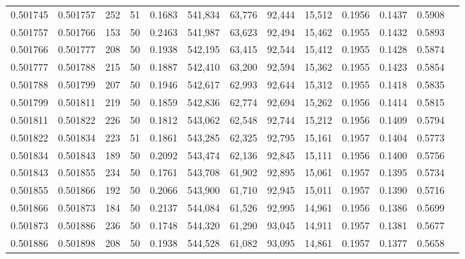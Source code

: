 \begin{tabular}{rrrrrrrrrrrrr}
0.501745 & 0.501757 & 252 &  51 &                                     0.1683 & 541,834 &  63,776 &  92,444 &  15,512 & 0.1956 & 0.1437 & 0.5908 \\
0.501757 & 0.501766 & 153 &  50 &                                     0.2463 & 541,987 &  63,623 &  92,494 &  15,462 & 0.1955 & 0.1432 & 0.5893 \\
0.501766 & 0.501777 & 208 &  50 &                                     0.1938 & 542,195 &  63,415 &  92,544 &  15,412 & 0.1955 & 0.1428 & 0.5874 \\
0.501777 & 0.501788 & 215 &  50 &                                     0.1887 & 542,410 &  63,200 &  92,594 &  15,362 & 0.1955 & 0.1423 & 0.5854 \\
0.501788 & 0.501799 & 207 &  50 &                                     0.1946 & 542,617 &  62,993 &  92,644 &  15,312 & 0.1955 & 0.1418 & 0.5835 \\
0.501799 & 0.501811 & 219 &  50 &                                     0.1859 & 542,836 &  62,774 &  92,694 &  15,262 & 0.1956 & 0.1414 & 0.5815 \\
0.501811 & 0.501822 & 226 &  50 &                                     0.1812 & 543,062 &  62,548 &  92,744 &  15,212 & 0.1956 & 0.1409 & 0.5794 \\
0.501822 & 0.501834 & 223 &  51 &                                     0.1861 & 543,285 &  62,325 &  92,795 &  15,161 & 0.1957 & 0.1404 & 0.5773 \\
0.501834 & 0.501843 & 189 &  50 &                                     0.2092 & 543,474 &  62,136 &  92,845 &  15,111 & 0.1956 & 0.1400 & 0.5756 \\
0.501843 & 0.501855 & 234 &  50 &                                     0.1761 & 543,708 &  61,902 &  92,895 &  15,061 & 0.1957 & 0.1395 & 0.5734 \\
0.501855 & 0.501866 & 192 &  50 &                                     0.2066 & 543,900 &  61,710 &  92,945 &  15,011 & 0.1957 & 0.1390 & 0.5716 \\
0.501866 & 0.501873 & 184 &  50 &                                     0.2137 & 544,084 &  61,526 &  92,995 &  14,961 & 0.1956 & 0.1386 & 0.5699 \\
0.501873 & 0.501886 & 236 &  50 &                                     0.1748 & 544,320 &  61,290 &  93,045 &  14,911 & 0.1957 & 0.1381 & 0.5677 \\
0.501886 & 0.501898 & 208 &  50 &                                     0.1938 & 544,528 &  61,082 &  93,095 &  14,861 & 0.1957 & 0.1377 & 0.5658 \\

\end{tabular}
